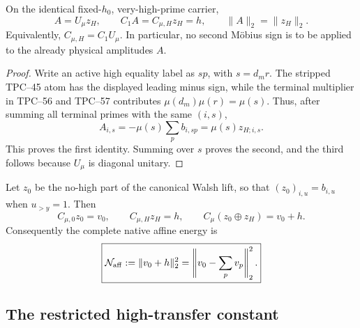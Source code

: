 \begin{proposition}
\label{prop:tpc58-exact-gauge-alignment}
On the identical fixed-\(h_0\), very-high-prime carrier,
\begin{equation}
 \boxed{
 A=U_\mu z_H,
 \qquad
 C_1A=C_{\mu,H}z_H=h,
 \qquad
 \|A\|_2=\|z_H\|_2.}
 \label{eq:tpc58-gauge-alignment}
\end{equation}
Equivalently, \(C_{\mu,H}=C_1U_\mu\).  In particular, no second
M\"obius sign is to be applied to the already physical amplitudes \(A\).
\end{proposition}

\begin{proof}
Write an active high equality label as \(sp\), with \(s=d_mr\).  The
stripped TPC--45 atom has the displayed leading minus sign, while the
terminal multiplier in TPC--56 and TPC--57 contributes
\(\mu(d_m)\mu(r)=\mu(s)\).  Thus, after summing all terminal primes with
the same \((i,s)\),
\[
 A_{i,s}
 =-\mu(s)\sum_p b_{i,sp}
 =\mu(s)z_{H;i,s}.
\]
This proves the first identity.  Summing over \(s\) proves the second,
and the third follows because \(U_\mu\) is diagonal unitary.
\end{proof}

Let \(z_0\) be the no-high part of the canonical Walsh lift, so that
\((z_0)_{i,u}=b_{i,u}\) when \(u_{>y}=1\).  Then
\begin{equation}
 C_{\mu,0}z_0=v_0,
 \qquad
 C_{\mu,H}z_H=h,
 \qquad
 C_\mu(z_0\oplus z_H)=v_0+h.
 \label{eq:tpc58-full-affine-erasure}
\end{equation}
Consequently the complete native affine energy is
\begin{equation}
 \boxed{
 \mathcal N_{\rm aff}:=\|v_0+h\|_2^2
 =\left\|v_0-\sum_pv_p\right\|_2^2.}
 \label{eq:tpc58-native-affine-energy}
\end{equation}

\subsection{The restricted high-transfer constant}

